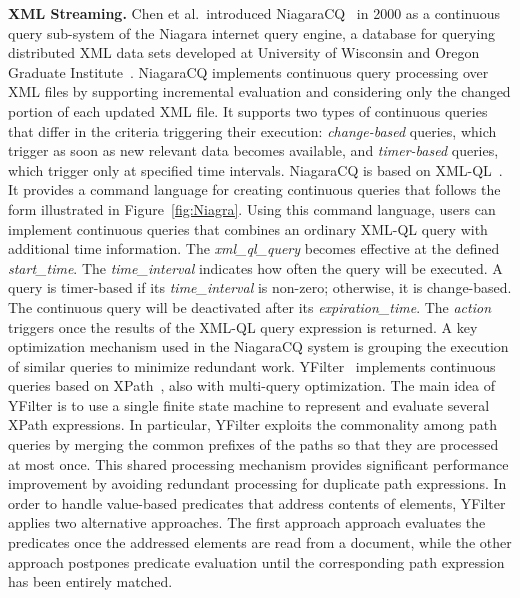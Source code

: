 \textbf{XML Streaming.}
Chen et al.\ introduced NiagaraCQ~\cite{chen_et_al_2000} in 2000 as a
continuous query sub-system of the Niagara internet query engine, a
data\-base for querying distributed XML data sets developed at
University of Wisconsin and Oregon Graduate
Institute~\cite{naughton2001niagara}. NiagaraCQ implements continuous
query processing over XML files by supporting incremental evaluation
and considering only the changed portion of each updated XML file. It
supports two types of continuous queries that differ in the criteria
triggering their execution: \emph{change-based} queries, which trigger
as soon as new relevant data becomes available, and \emph{timer-based}
queries, which trigger only at specified time intervals.  NiagaraCQ is
based on XML-QL~\cite{deutsch1999query}.  It provides a command
language for creating continuous queries that follows the form
illustrated in Figure~\ref{fig:Niagra}. Using this command language,
users can implement continuous queries that combines an ordinary
XML-QL query with additional time information.  The
\textsf{\small\textit{xml\_ql\_query}} becomes effective at the
defined \textsf{\small\textit{start\_time}}.  The
\textsf{\small\textit{time\_interval}} indicates how often the query
will be executed. A query is timer-based if its
\textsf{\small\textit{time\_interval}} is non-zero; otherwise, it is
change-based.  The continuous query will be deactivated after its
\textsf{\small\textit{expiration\_time}}. The
\textsf{\small\textit{action}} triggers once the results of the XML-QL
query expression is returned.  A key optimization mechanism used in
the NiagaraCQ system is grouping the execution of similar queries to
minimize redundant work.  YFilter~\cite{diao_et_al_2002,diao2003high} implements
continuous queries based on XPath~\cite{clark_derose_1999}, also with
multi-query optimization. The main idea of YFilter is to use a single
finite state machine to represent and evaluate several XPath
expressions. In particular, YFilter exploits the commonality among path queries by merging the common prefixes
of the paths so that they are processed at most once. This  shared processing mechanism provides significant performance
improvement by avoiding redundant processing for duplicate path expressions. In order to handle value-based predicates that address contents of elements, YFilter applies two alternative approaches. The first approach approach evaluates the  predicates once the addressed elements are read from a document, while the other approach postpones predicate evaluation until the corresponding path expression has been entirely matched.

